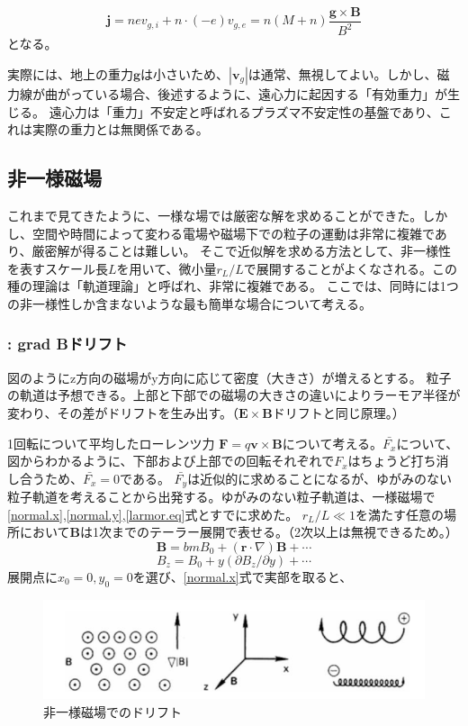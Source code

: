 \documentclass{ltjsarticle}
\numberwithin{equation}{section} %
\begin{document}
\begin{equation}
  \bm{j} = nev_{g,i} + n\cdot (-e)v_{g,e} = n(M+n)\frac{\bm{g}\times \bm{B}}{B^2}
\end{equation}
となる。

実際には、地上の重力$\bm{g}$は小さいため、$|\bm{v}_g|$は通常、無視してよい。しかし、磁力線が曲がっている場合、後述するように、遠心力に起因する「有効重力」が生じる。
遠心力は「重力」不安定と呼ばれるプラズマ不安定性の基盤であり、これは実際の重力とは無関係である。

\subsection{非一様磁場}
これまで見てきたように、一様な場では厳密な解を求めることができた。しかし、空間や時間によって変わる電場や磁場下での粒子の運動は非常に複雑であり、厳密解が得ることは難しい。
そこで近似解を求める方法として、非一様性を表すスケール長$L$を用いて、微小量$r_L/L$で展開することがよくなされる。この種の理論は「軌道理論」と呼ばれ、非常に複雑である。
ここでは、同時には1つの非一様性しか含まないような最も簡単な場合について考える。

\subsubsection{\nabla {} \perp {} : grad Bドリフト}
図のようにz方向の磁場がy方向に応じて密度（大きさ）が増えるとする。
粒子の軌道は予想できる。上部と下部での磁場の大きさの違いによりラーモア半径が変わり、その差がドリフトを生み出す。（$\bm{E}\times \bm{B}$ドリフトと同じ原理。）

1回転について平均したローレンツ力 $\bm{F} = q\bm{v} \times \bm{B}$について考える。$\bar{F_x}$について、図からわかるように、下部および上部での回転それぞれで$F_x$はちょうど打ち消し合うため、$\bar{F_x}=0$である。
$\bar{F_y}$は近似的に求めることになるが、ゆがみのない粒子軌道を考えることから出発する。ゆがみのない粒子軌道は、一様磁場で\eqref{normal.x},\eqref{normal.y},\eqref{larmor.eq}式とすでに求めた。
$r_L/L\ll 1$を満たす任意の場所において$\bm{B}$は1次までのテーラー展開で表せる。（2次以上は無視できるため。）
\begin{equation}
  \bm{B} = bm{B}_0 + (\bm{r}\cdot \nabla)\bm{B} + \cdots
\end{equation}
\[
  B_z = B_0 + y(\partial B_z/\partial y) + \cdots
\]
展開点に$x_0=0, y_0=0$を選び、\eqref{normal.x}式で実部を取ると、

\begin{figure}[htbp]
  \centering
  \includegraphics[width=0.7\linewidth]{gradB_drift.png}
  \caption{非一様磁場でのドリフト}
  \label{fig.gradB_drift}
\end{figure}
\end{document}
